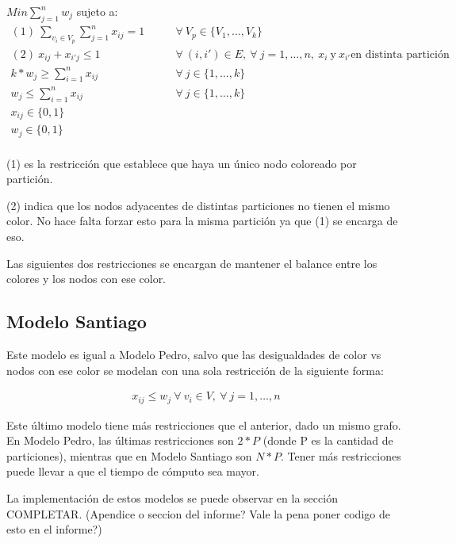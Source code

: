 \documentclass[a4paper, 10pt, twoside]{article}
\begin{document}
$Min \sum_{j=1}^{n} w_j$ sujeto a:
\begin{align*}
(1)\ \sum_{v_i \in V_p}\sum_{j=1}^{n} x_{ij} = 1 \qquad & \forall \ V_p \in \{V_1, \ldots, V_k\}\\
(2)\ x_{ij} + x_{i'j} \leq 1 \qquad & \forall \ (i,i') \in E, \ \forall \ j = 1, \ldots, n, \ x_i \ \text{y} \ x_{i'} \text{en distinta partición}\\
k * w_j \geq \sum_{i=1}^{n} x_{ij} \qquad & \forall \ j \in \{1, \ldots, k\}\\
w_j \leq \sum_{i=1}^{n} x_{ij} \qquad & \forall \ j \in \{1, \ldots, k\}\\
x_{ij} \in \{0,1\}\\
w_j \in \{0,1\}\\
\end{align*}

(1) es la restricción que establece que haya un único nodo coloreado por partición.

(2) indica que los nodos adyacentes de distintas particiones no tienen el mismo color. No hace falta forzar esto para la misma partición ya que (1) se encarga de eso.

Las siguientes dos restricciones se encargan de mantener el balance entre los colores y los nodos con ese color.

\subsection{Modelo Santiago}

Este modelo es igual a Modelo Pedro, salvo que las desigualdades de color vs nodos con ese color se modelan con una sola restricción de la siguiente forma:

\begin{align*}
x_{ij} \leq w_j \ \forall \ v_i \in V, \ \forall \ j=1,\ldots,n
\end{align*}

Este último modelo tiene más restricciones que el anterior, dado un mismo grafo. En Modelo Pedro, las últimas restricciones son $2 * P$ (donde P es la cantidad de particiones), mientras que en Modelo Santiago son $N * P$. Tener más restricciones puede llevar a que el tiempo de cómputo sea mayor. %

La implementación de estos modelos se puede observar en la sección COMPLETAR. (Apendice o seccion del informe? Vale la pena poner codigo de esto en el informe?)
\end{document}
